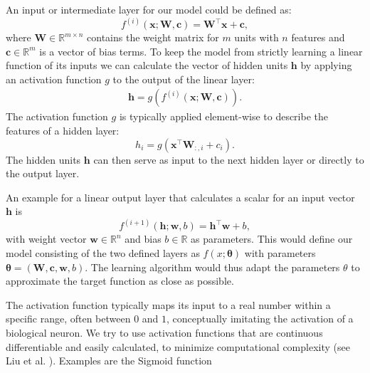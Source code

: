 An input or intermediate layer for our model could be defined as:
\begin{equation}
    f^{(i)}(\mathbf{x}; \mathbf{W},\mathbf{c})=\mathbf{W}^\top\mathbf{x}+\mathbf{c},
\end{equation}
where $\mathbf{W} \in \mathbb{R}^{m\times n}$ contains the weight matrix for $m$ units with $n$ features and $\mathbf{c}\in \mathbb{R}^m$ is a vector of bias terms.
To keep the model from strictly learning a linear function of its inputs we can calculate the vector of hidden units $\mathbf{h}$ by applying an activation function $g$ to the output of the linear layer:
\begin{align}
    \mathbf{h} = g(f^{(i)}(\mathbf{x}; \mathbf{W},\mathbf{c})).
\end{align}
The activation function $g$ is typically applied element-wise to describe the features of a hidden layer:
\begin{equation}
    h_i = g(\mathbf{x}^\top\mathbf{W}_{:,i}+c_i).
\end{equation}
The hidden units $\mathbf{h}$ can then serve as input to the next hidden layer or directly to the output layer.

An example for a linear output layer that calculates a scalar for an input vector $\mathbf{h}$ is
\begin{equation}
    f^{(i+1)}(\mathbf{h}; \mathbf{w},b)=\mathbf{h}^\top\mathbf{w}+b,
\end{equation}
with weight vector $\mathbf{w} \in \mathbb{R}^n$ and bias $b \in \mathbb{R}$ as parameters. This would define our model consisting of the two defined layers as $f(x;\boldsymbol{\theta})$ with parameters $\boldsymbol{\theta} = (\mathbf{W}, \mathbf{c}, \mathbf{w}, b)$. The learning algorithm would thus adapt the parameters $\theta$ to approximate the target function as close as possible.

The activation function typically maps its input to a real number within a specific range, often between $0$ and $1$, conceptually imitating the activation of a biological neuron. We try to use activation functions that are continuous differentiable and easily calculated, to minimize computational complexity (see Liu et al. \cite{Liu2020}). Examples are the Sigmoid function

